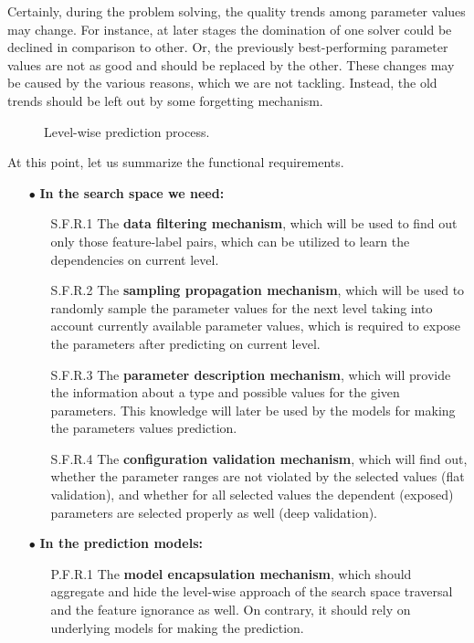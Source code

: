 Certainly, during the problem solving, the quality trends among parameter values may change. For instance, at later stages the domination of one solver could be declined in comparison to other. Or, the previously best-performing parameter values are not as good and should be replaced by the other. These changes may be caused by the various reasons, which we are not tackling. Instead, the old trends should be left out by some forgetting mechanism.

\begin{figure}
	\centering
	
	\caption{Level-wise prediction process.}
	\label{concept:pict:Level-wise prediction process}
\end{figure}

At this point, let us summarize the functional requirements.
\begin{itemize}
	\item[$\bullet$] \textbf{In the search space we need:}
	\begin{enumerate}
		\item[S.F.R.1] The \textbf{data filtering mechanism}, which will be used to find out only those feature-label pairs, which can be utilized to learn the dependencies on current level.
		
		\item[S.F.R.2] The \textbf{sampling propagation mechanism}, which will be used to randomly sample the parameter values for  the next level taking into account currently available parameter values, which is required to expose the parameters after predicting on current level.
		
		\item[S.F.R.3] The \textbf{parameter description mechanism}, which will provide the information about a type and possible values for the given parameters. This knowledge will later be used by the models for making the parameters values prediction.
		
		\item[S.F.R.4] The \textbf{configuration validation mechanism}, which will find out, whether the parameter ranges are not violated by the selected values (flat validation), and whether for all selected values the dependent (exposed) parameters are selected properly as well (deep validation).
	\end{enumerate}

	\item[$\bullet$] \textbf{In the prediction models:}
	\begin{enumerate}
		\item[P.F.R.1] The \textbf{model encapsulation mechanism}, which should aggregate and hide the level-wise approach of the search space traversal and the feature ignorance as well. On contrary, it should rely on underlying models for making the prediction.
		

\end{enumerate}
\end{itemize}
